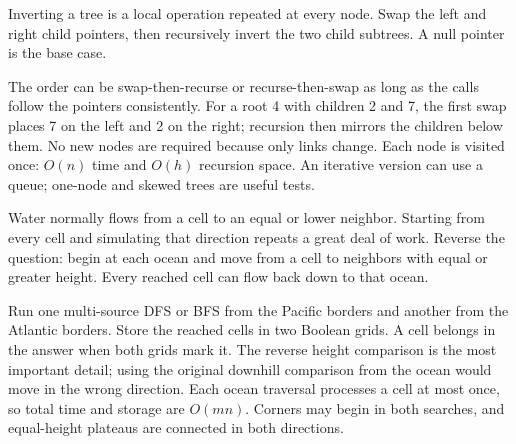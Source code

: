 \expandafter\def\csname sourcewalkthrough@74\endcsname{%
Inverting a tree is a local operation repeated at every node. Swap the left
and right child pointers, then recursively invert the two child subtrees. A
null pointer is the base case.

\enlargethispage{2\baselineskip}
The order can be swap-then-recurse or recurse-then-swap as long as the calls
follow the pointers consistently. For a root 4 with children 2 and 7, the
first swap places 7 on the left and 2 on the right; recursion then mirrors the
children below them. No new nodes are required because only links change.
Each node is visited once: \(O(n)\) time and \(O(h)\) recursion space. An
iterative version can use a queue; one-node and skewed trees are useful tests.}

\expandafter\def\csname sourcewalkthrough@75\endcsname{%
Water normally flows from a cell to an equal or lower neighbor. Starting from
every cell and simulating that direction repeats a great deal of work. Reverse
the question: begin at each ocean and move from a cell to neighbors with equal
or greater height. Every reached cell can flow back down to that ocean.

Run one multi-source DFS or BFS from the Pacific borders and another from the
Atlantic borders. Store the reached cells in two Boolean grids. A cell belongs
in the answer when both grids mark it. The reverse height comparison is the
most important detail; using the original downhill comparison from the ocean
would move in the wrong direction. Each ocean traversal processes a cell at
most once, so total time and storage are \(O(mn)\). Corners may begin in both
searches, and equal-height plateaus are connected in both directions.}